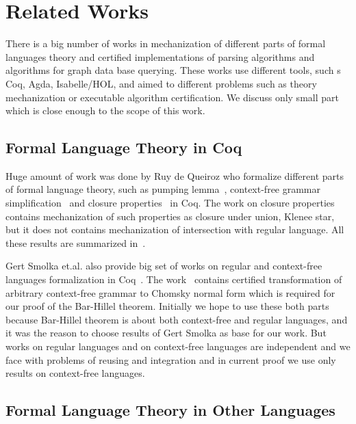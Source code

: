 \section{Related Works}
\label{sec:rel-work}

There is a big number of works in mechanization of different parts of formal languages theory and certified implementations of parsing algorithms and algorithms for graph data base querying.
These works use different tools, such s Coq, Agda, Isabelle/HOL, and aimed to different problems such as theory mechanization or executable algorithm certification.
We discuss only small part which is close enough to the scope of this work.

\subsection{Formal Language Theory in Coq}

Huge amount of work was done by Ruy de Queiroz who formalize different parts of formal language theory, such as pumping lemma~\cite{ramos2015formalizationPumping}, context-free grammar simplification~\cite{ramos2015formalization} and closure properties~\cite{ramos2015formalizationClosure} in Coq.
The work on closure properties contains mechanization of such properties as closure under union, Klenee star, but it does not contains mechanization of intersection with regular language.
All these results are summarized in~\cite{ramos2016formalization}. 

Gert Smolka et.al. also provide big set of works on regular and context-free languages formalization in Coq~\cite{smolka2017regular,smolka2013regular,kaiser2012constructive,smolkaHofmann2016}.
The work~\cite{smolkaHofmann2016} contains certified transformation of arbitrary context-free grammar to Chomsky normal form which is required for our proof of the Bar-Hillel theorem. 
Initially we hope to use these both parts because Bar-Hillel theorem is about both context-free and regular languages, and it was the reason to choose results of Gert Smolka as base for our work.
But works on regular languages and on context-free languages are independent and we face with  problems of reusing and integration and in current proof we use only results on context-free languages.

\subsection{Formal Language Theory in Other Languages}

